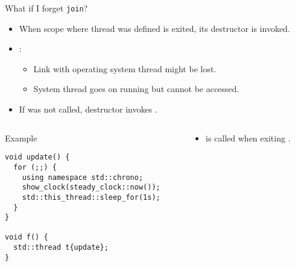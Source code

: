 \begin{frame}[fragile]{What if I forget \texttt{join}?}
\begin{itemize}
  \item When scope where thread was defined is exited, its destructor is invoked.
  \item {}: 
    \begin{itemize}
      \item Link with operating system thread might be lost. 
      \item System thread goes on running but cannot be accessed.
    \end{itemize}
  \item If  was not called, destructor invokes .
\end{itemize}

\begin{columns}

\begin{column}{.5\textwidth}
\begin{block}{Example}
\begin{lstlisting}[basicstyle=\tiny]
void update() {
  for (;;) {
    using namespace std::chrono;
    show_clock(steady_clock::now());
    std::this_thread::sleep_for(1s);
  }
}

void f() {
  std::thread t{update};
}
\end{lstlisting}
\end{block}
\end{column}

\begin{column}{.5\textwidth}
\begin{itemize}
  \item {} is called when exiting .
\end{itemize}
\end{column}
\end{columns}
\end{frame}

